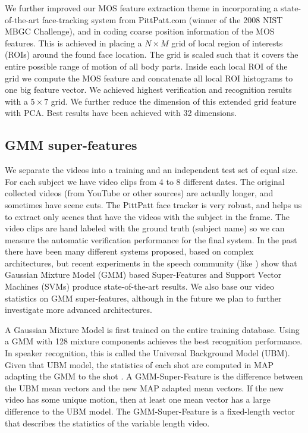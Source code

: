 \documentclass[times, 10pt,twocolumn]{article}
\begin{document}
We further improved our MOS feature extraction theme in incorporating a state-of-the-art face-tracking system from PittPatt.com \cite{pittpatt} (winner of the 2008 NIST MBGC Challenge), and in coding coarse position information of the MOS features.  This is achieved in placing a $N \times M$ grid of local region of interests (ROIs) around the found face location. The grid is scaled such that it covers the entire possible range of motion of all body parts.  Inside each local ROI of the grid we compute the MOS feature and concatenate all local ROI histograms to one big feature vector.  We achieved highest verification and recognition results with a $5 \times 7$ grid.  We further reduce the dimension of this extended grid feature with PCA.  Best results have been achieved with 32  dimensions.

\subsection{GMM super-features}
\label{sec_superfeat}
We separate the videos into a training and an independent test set of equal size.  For each subject we have video clips from 4 to 8 different dates.   The original collected videos (from YouTube or other sources) are actually longer, and sometimes have scene cuts.  The PittPatt face tracker is very robust, and helps us to extract only scenes that have the videos with the subject in the frame.
The video clips are hand labeled with the ground truth (subject name) so we can measure the automatic verification performance for the final system.   In the past there have been many different systems proposed, based on complex architectures, but recent experiments in the speech community (like \cite{Campbell06supportvector}) show that Gaussian Mixture Model (GMM) based Super-Features and Support Vector Machines (SVMs) produce state-of-the-art results.  We also base our video statistics on GMM super-features, although in the future we plan to further investigate more advanced architectures.

A Gaussian Mixture Model is first trained on the entire training database.  Using a GMM with 128 mixture components achieves the best recognition performance.  In speaker recognition, this is called the Universal Background Model (UBM). Given that UBM model, the statistics of each shot are computed in MAP adapting the GMM to the shot \cite{Campbell06supportvector}.  A GMM-Super-Feature is the difference between the UBM mean vectors and the new MAP adapted mean vectors.  If the new video has some unique motion, then at least one mean vector has a large difference to the UBM model.  The GMM-Super-Feature is a fixed-length vector that describes the statistics of the variable length video.   
\end{document}
